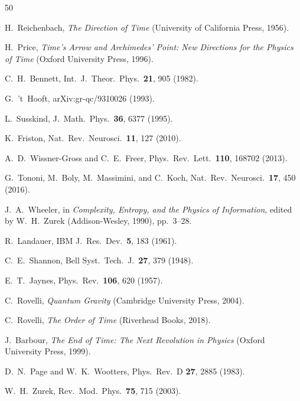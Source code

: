 \documentclass[12pt,a4paper]{article}
\begin{document}
\begin{thebibliography}{50}

H.~Reichenbach, \textit{The Direction of Time} (University of California Press, 1956).

H.~Price, \textit{Time's Arrow and Archimedes' Point: New Directions for the Physics of Time} (Oxford University Press, 1996).

C.~H.~Bennett, Int.~J.~Theor.~Phys.~\textbf{21}, 905 (1982).

G.~'t~Hooft, arXiv:gr-qc/9310026 (1993).

L.~Susskind, J.~Math.~Phys.~\textbf{36}, 6377 (1995).

K.~Friston, Nat.~Rev.~Neurosci.~\textbf{11}, 127 (2010).

A.~D.~Wissner-Gross and C.~E.~Freer, Phys.~Rev.~Lett.~\textbf{110}, 168702 (2013).

G.~Tononi, M.~Boly, M.~Massimini, and C.~Koch, Nat.~Rev.~Neurosci.~\textbf{17}, 450 (2016).

J.~A.~Wheeler, in \textit{Complexity, Entropy, and the Physics of Information}, edited by W.~H.~Zurek (Addison-Wesley, 1990), pp.~3--28.

R.~Landauer, IBM J.~Res.~Dev.~\textbf{5}, 183 (1961).

C.~E.~Shannon, Bell Syst.~Tech.~J.~\textbf{27}, 379 (1948).

E.~T.~Jaynes, Phys.~Rev.~\textbf{106}, 620 (1957).

C.~Rovelli, \textit{Quantum Gravity} (Cambridge University Press, 2004).

C.~Rovelli, \textit{The Order of Time} (Riverhead Books, 2018).

J.~Barbour, \textit{The End of Time: The Next Revolution in Physics} (Oxford University Press, 1999).

D.~N.~Page and W.~K.~Wootters, Phys.~Rev.~D \textbf{27}, 2885 (1983).

W.~H.~Zurek, Rev.~Mod.~Phys.~\textbf{75}, 715 (2003).


\end{thebibliography}
\end{document}
